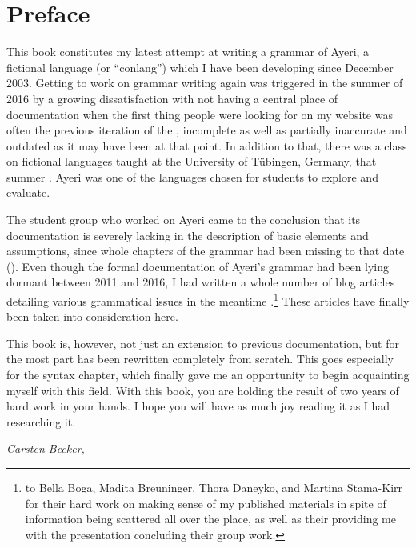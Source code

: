 \chapter{Preface}

This book constitutes my latest attempt at writing a grammar of Ayeri, a
fictional language (or \enquote{conlang}) which I have been developing since
December 2003. Getting to work on grammar writing again was triggered in the
summer of 2016 by a growing dissatisfaction with not having a central place of
documentation when the first thing people were looking for on my website was
often the previous iteration of the , incomplete as well as
partially inaccurate and outdated as it may have been at that point. In
addition to that, there was a class on fictional languages taught at the
University of Tübingen, Germany, that summer \autocite{buch2016ss}. Ayeri was
one of the languages chosen for students to explore and evaluate.

The student group who worked on Ayeri came to the conclusion that its
documentation is severely lacking in the description of basic elements and
assumptions, since whole chapters of the grammar had been missing to that date
(\cite[12]{boga2016}). Even though the formal documentation of Ayeri's grammar
had been lying dormant between 2011 and 2016, I had written a whole number of
blog articles detailing various grammatical issues in the meantime
\autocite[Blog]{benung}.\footnote{ to Bella Boga, Madita Breuninger, Thora Daneyko, and Martina Stama-Kirr
for their hard work on making sense of my published materials in spite of
information being scattered all over the place, as well as their providing me
with the presentation concluding their group work.}  These articles have
finally been taken into consideration here.

This book is, however, not just an extension to previous documentation, but for
the most part has been rewritten completely from scratch. This goes especially
for the syntax chapter, which finally gave me an opportunity to begin
acquainting myself with this field. With this book, you are holding the result
of two years of hard work in your hands. I hope you will have as much joy
reading it as I had researching it.

\begin{flushright}\itshape\footnotesize
{}
Carsten Becker,  \the\year
\end{flushright}